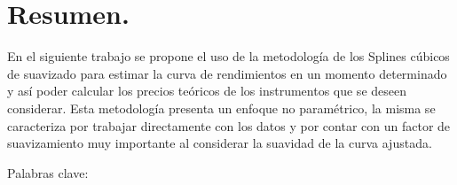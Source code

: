 \chapter*{Resumen.}



\hspace{0.4cm} En el siguiente trabajo se propone el uso de la metodolog\'ia de los Splines c\'ubicos de suavizado para estimar la curva de rendimientos en un momento determinado y as\'i poder calcular los precios te\'oricos de los instrumentos que se deseen considerar. Esta metodolog\'ia presenta un enfoque no param\'etrico, la misma se caracteriza por trabajar directamente con los datos y por contar con un factor de suavizamiento muy importante al considerar la suavidad de la curva ajustada. 

Palabras clave: 
